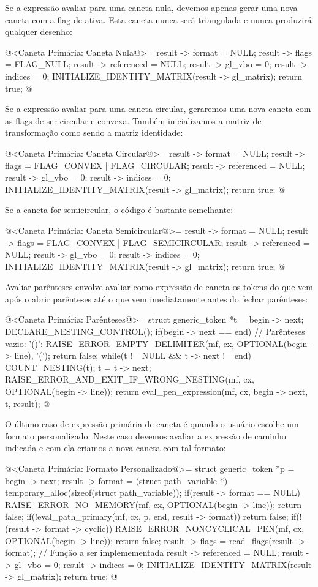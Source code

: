 {{{{{{Se a expressão avaliar para uma caneta nula, devemos apenas gerar uma
nova caneta com a flag de  ativa. Esta caneta
nunca será triangulada e nunca produzirá qualquer desenho:

\iniciocodigo
@<Caneta Primária: Caneta Nula@>=
result -> format = NULL;
result -> flags = FLAG_NULL;
result -> referenced = NULL;
result -> gl_vbo = 0;
result -> indices = 0;
INITIALIZE_IDENTITY_MATRIX(result -> gl_matrix);
return true;
@
\fimcodigo

Se a expressão avaliar para uma caneta circular, geraremos uma nova
caneta com as flags de ser circular e convexa. Também inicializamos a
matriz de transformação como sendo a matriz identidade:

\iniciocodigo
@<Caneta Primária: Caneta Circular@>=
result -> format = NULL;
result -> flags = FLAG_CONVEX | FLAG_CIRCULAR;
result -> referenced = NULL;
result -> gl_vbo = 0;
result -> indices = 0;
INITIALIZE_IDENTITY_MATRIX(result -> gl_matrix);
return true;
@
\fimcodigo

Se a caneta for semicircular, o código é bastante semelhante:

\iniciocodigo
@<Caneta Primária: Caneta Semicircular@>=
result -> format = NULL;
result -> flags = FLAG_CONVEX | FLAG_SEMICIRCULAR;
result -> referenced = NULL;
result -> gl_vbo = 0;
result -> indices = 0;
INITIALIZE_IDENTITY_MATRIX(result -> gl_matrix);
return true;
@
\fimcodigo

Avaliar parênteses envolve avaliar como expressão de caneta os tokens
do que vem após o abrir parênteses até o que vem imediatamente antes
do fechar parênteses:

\iniciocodigo
@<Caneta Primária: Parênteses@>=
struct generic_token *t = begin -> next;
DECLARE_NESTING_CONTROL();
if(begin -> next == end){ // Parênteses vazio: '()':
  RAISE_ERROR_EMPTY_DELIMITER(mf, cx, OPTIONAL(begin -> line), '(');
  return false;
}
while(t != NULL && t -> next != end){
  COUNT_NESTING(t);
  t = t -> next;
}
RAISE_ERROR_AND_EXIT_IF_WRONG_NESTING(mf, cx, OPTIONAL(begin -> line));
return eval_pen_expression(mf, cx, begin -> next, t, result);
@
\fimcodigo

O último caso de expressão primária de caneta é quando o usuário
escolhe um formato personalizado. Neste caso devemos avaliar a
expressão de caminho indicada e com ela criamos a nova caneta com tal
formato:

\iniciocodigo
@<Caneta Primária: Formato Personalizado@>=
struct generic_token *p = begin -> next;
result -> format =
        (struct path_variable *) temporary_alloc(sizeof(struct path_variable));
if(result -> format == NULL){
  RAISE_ERROR_NO_MEMORY(mf, cx, OPTIONAL(begin -> line));
  return false;
}
if(!eval_path_primary(mf, cx, p, end, result -> format))
  return false;
if(!(result -> format -> cyclic)){
  RAISE_ERROR_NONCYCLICAL_PEN(mf, cx, OPTIONAL(begin -> line));
  return false;
}
result -> flags = read_flags(result -> format); // Função a ser implemementada
result -> referenced = NULL;
result -> gl_vbo = 0;
result -> indices = 0;
INITIALIZE_IDENTITY_MATRIX(result -> gl_matrix);
return true;
@
\fimcodigo

}}}}}}
